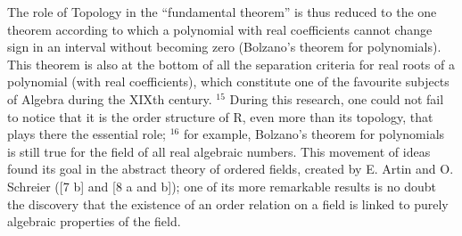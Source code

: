 The role of Topology in the ``fundamental theorem'' is thus reduced to the one theorem according to which a polynomial with real coefficients cannot change sign in an interval without becoming zero (Bolzano's theorem for polynomials). This theorem is also at the bottom of all the separation criteria for real roots of a polynomial (with real coefficients), which constitute one of the favourite subjects of Algebra during the XIXth century. \(^{15}\) During this research, one could not fail to notice that it is the order structure of R, even more than its topology, that plays there the essential role; \(^{16}\) for example, Bolzano's theorem for polynomials is still true for the field of all real algebraic numbers. This movement of ideas found its goal in the abstract theory of ordered fields, created by E. Artin and O. Schreier ({[}7 b{]} and {[}8 a and b{]}); one of its more remarkable results is no doubt the discovery that the existence of an order relation on a field is linked to purely algebraic properties of the field.
\relax{}

